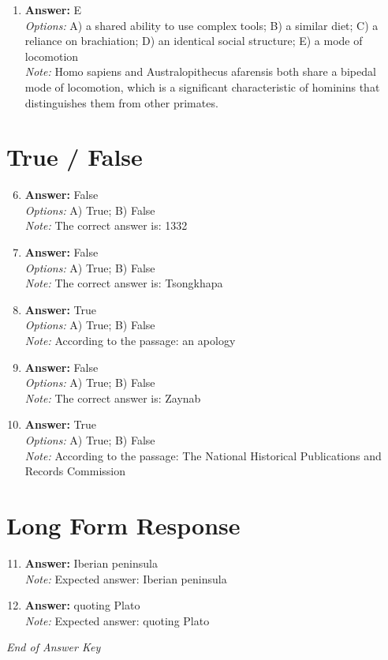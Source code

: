 \documentclass[12pt]{article}
\begin{document}
\begin{enumerate}[label=\arabic*.]
\\ \textit{Note:} The Mousterian tool technology, characterized by a sophisticated flake-based manufacturing technique, is specifically associated with Neandertals, reflecting their advanced cognitive abilities and adaptation to diverse environments during the Middle Paleolithic period.
\item \textbf{Answer:} E
\\ \textit{Options:} A) a shared ability to use complex tools; B) a similar diet; C) a reliance on brachiation; D) an identical social structure; E) a mode of locomotion
\\ \textit{Note:} Homo sapiens and Australopithecus afarensis both share a bipedal mode of locomotion, which is a significant characteristic of hominins that distinguishes them from other primates.
\end{enumerate}

\section*{True / False}
\begin{enumerate}[label=\arabic*.]
\setcounter{enumi}{5}
\item \textbf{Answer:} False
\\ \textit{Options:} A) True; B) False
\\ \textit{Note:} The correct answer is: 1332
\item \textbf{Answer:} False
\\ \textit{Options:} A) True; B) False
\\ \textit{Note:} The correct answer is: Tsongkhapa
\item \textbf{Answer:} True
\\ \textit{Options:} A) True; B) False
\\ \textit{Note:} According to the passage: an apology
\item \textbf{Answer:} False
\\ \textit{Options:} A) True; B) False
\\ \textit{Note:} The correct answer is: Zaynab
\item \textbf{Answer:} True
\\ \textit{Options:} A) True; B) False
\\ \textit{Note:} According to the passage: The National Historical Publications and Records Commission
\end{enumerate}

\section*{Long Form Response}
\begin{enumerate}[label=\arabic*.]
\setcounter{enumi}{10}
\item \textbf{Answer:} Iberian peninsula
\\ \textit{Note:} Expected answer: Iberian peninsula
\item \textbf{Answer:} quoting Plato
\\ \textit{Note:} Expected answer: quoting Plato
\end{enumerate}

\vfill
\noindent\textit{End of Answer Key}
\end{document}
